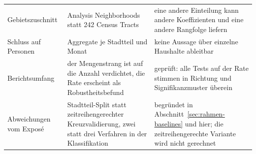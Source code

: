 \begin{table}[H]
\begin{tabularx}{\textwidth}{@{}>{\raggedright\arraybackslash}p{3.1cm} >{\raggedright\arraybackslash}p{4.4cm} >{\raggedright\arraybackslash}X@{}}
\addlinespace
Gebietszuschnitt & 35 Analysis Neighborhoods statt 242 Census Tracts & eine andere Einteilung kann andere Koeffizienten und eine andere Rangfolge liefern \\
\addlinespace
Schluss auf Personen & Aggregate je Stadtteil und Monat & keine Aussage über einzelne Haushalte ableitbar \\
\addlinespace
Berichtsumfang & der Mengenstrang ist auf die Anzahl verdichtet, die Rate erscheint als Robustheitsbefund & geprüft: alle Tests auf der Rate stimmen in Richtung und Signifikanzmuster überein \\
\addlinespace
Abweichungen vom Exposé & Stadtteil-Split statt zeitreihengerechter Kreuzvalidierung, zwei statt drei Verfahren in der Klassifikation & begründet in Abschnitt~\ref{sec:rahmen-baselines} und hier; die zeitreihengerechte Variante wird nicht gerechnet \\
\bottomrule
\end{tabularx}
\end{table}



